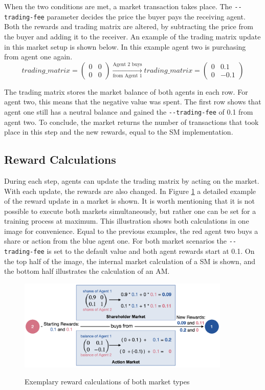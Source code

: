 When the two conditions are met, a market transaction takes place. The \verb|--trading-fee| parameter decides the price the buyer pays the receiving agent. Both the rewards and trading matrix are altered, by subtracting the price from the buyer and adding it to the receiver. An example of the trading matrix update in this market setup is shown below. In this example agent two is purchasing from agent one again.
\begin{equation*}
trading\_matrix = 
\begin{pmatrix}
0 & 0 \\
0 & 0
\end{pmatrix} \xrightarrow[\text{from Agent 1}]{\text{Agent 2 buys}} 
trading\_matrix = 
\begin{pmatrix}
0 & 0.1 \\
0 & -0.1
\end{pmatrix} 
\end{equation*}

The trading matrix stores the market balance of both agents in each row. For agent two, this means that the negative value was spent. The first row shows that agent one still has a neutral balance and gained the \verb|--trading-fee| of 0.1 from agent two. To conclude, the market returns the number of transactions that took place in this step and the new rewards, equal to the SM implementation.

\subsection{Reward Calculations}\label{market_reward_calc}
During each step, agents can update the trading matrix by acting on the market. With each update, the rewards are also changed. In Figure \ref{fig:market_rewards} a detailed example of the reward update in a market is shown. It is worth mentioning that it is not possible to execute both markets simultaneously, but rather one can be set for a training process at maximum. This illustration shows both calculations in one image for convenience. Equal to the previous examples, the red agent two buys a share or action from the blue agent one. For both market scenarios the \verb|--trading-fee| is set to the default value and both agent rewards start at 0.1. On the top half of the image, the internal market calculation of a SM is shown, and the bottom half illustrates the calculation of an AM.
\begin{figure}[hpbt]
    \centering
    \includegraphics[width=0.9\textwidth]{pictures/new_market_rewards}\\
    \caption[Exemplary Reward Calculation Of Markets]{Exemplary reward calculations of both market types}\label{fig:market_rewards}
\end{figure}

